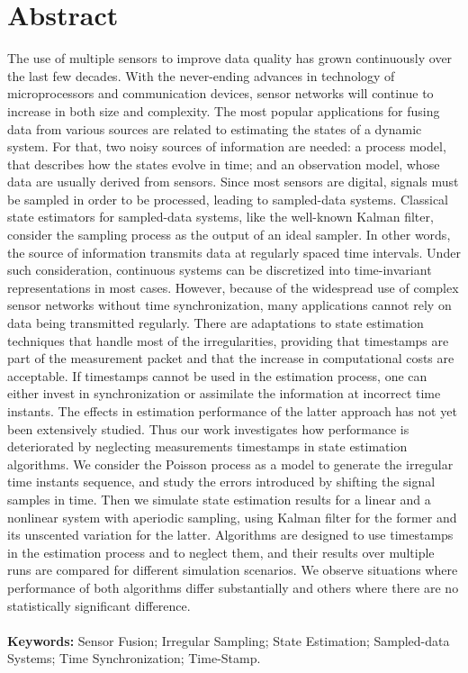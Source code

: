\chapter*{Abstract}

\vspace{-2cm} 
The use of multiple sensors to improve data quality has grown continuously over the last few decades. With the never-ending advances in technology of microprocessors and communication devices, sensor networks will continue to increase in both size and complexity. The most popular applications for fusing data from various sources are related to estimating the states of a dynamic system. For that, two noisy sources of information are needed: a process model, that describes how the states evolve in time; and an observation model, whose data are usually derived from sensors. Since most sensors are digital, signals must be sampled in order to be processed, leading to sampled-data systems. Classical state estimators for sampled-data systems, like the well-known Kalman filter, consider the sampling process as the output of an ideal sampler. In other words, the source of information transmits data at regularly spaced time intervals. Under such consideration, continuous systems can be discretized into time-invariant representations in most cases. However, because of the widespread use of complex sensor networks without time synchronization, many applications cannot rely on data being transmitted regularly. There are adaptations to state estimation techniques that handle most of the irregularities, providing that timestamps are part of the measurement packet and that the increase in computational costs are acceptable. If timestamps cannot be used in the estimation process, one can either invest in synchronization or assimilate the information at incorrect time instants. The effects in estimation performance of the latter approach has not yet been extensively studied. Thus our work investigates how performance is deteriorated by neglecting measurements timestamps in state estimation algorithms. We consider the Poisson process as a model to generate the irregular time instants sequence, and study the errors introduced by shifting the signal samples in time. Then we simulate state estimation results for a linear and a nonlinear system with aperiodic sampling, using Kalman filter for the former and its unscented variation for the latter. Algorithms are designed to use timestamps in the estimation process and to neglect them, and their results over multiple runs are compared for different simulation scenarios. We observe situations where performance of both algorithms differ substantially and others where there are no statistically significant difference. 
\\ \\
\textbf{Keywords:} Sensor Fusion; Irregular Sampling; State Estimation; Sampled-data Systems; Time Synchronization; Time-Stamp.

